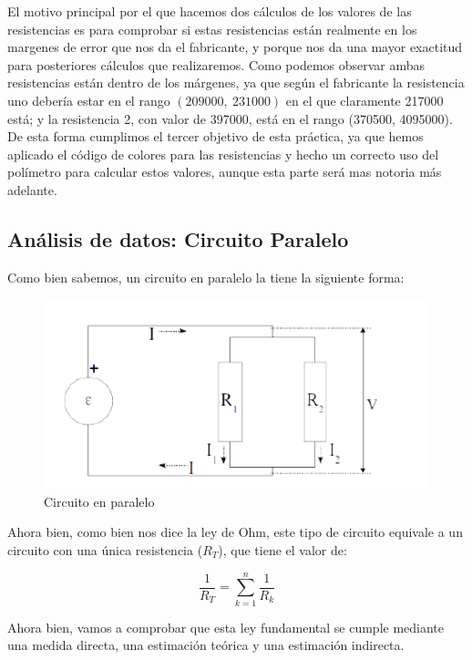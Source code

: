 \documentclass[10pt,a4paper]{article}
\begin{document}
El motivo principal por el que hacemos dos cálculos de los valores de las resistencias es para comprobar si estas resistencias están realmente en los margenes de error que nos da el fabricante, y porque nos da una mayor exactitud para posteriores cálculos que realizaremos.
Como podemos observar ambas resistencias están dentro de los márgenes, ya que según el fabricante la resistencia uno debería estar en el rango $(209000,\ 231000)$ en el que claramente 217000 está; y la resistencia 2, con valor de 397000, está en el rango (370500, 4095000).\\

De esta forma cumplimos el tercer objetivo de esta práctica, ya que hemos aplicado el código de colores para las resistencias y hecho un correcto uso del polímetro para calcular estos valores, aunque esta parte será mas notoria más adelante.
\subsection{Análisis de datos: Circuito Paralelo}

Como bien sabemos, un circuito en paralelo la tiene la siguiente forma: 

\begin{figure}[htb] %
\centering
\includegraphics[width=12.5cm, height=5.5cm]{Paralelo}
\caption{Circuito en paralelo}
\label{fig: Resistencias}
\end{figure}

Ahora bien, como bien nos dice la ley de Ohm, este tipo de circuito equivale a un circuito con una única resistencia ($R_T$), que tiene el valor de:

\begin{equation}
 \dfrac{1}{R_T}=\sum_{k=1}^n \dfrac{1}{R_k}
 \label{Paralelo}
\end{equation}

Ahora bien, vamos a comprobar que esta ley fundamental se cumple mediante una medida directa, una estimación teórica y una estimación indirecta.
\end{document}
